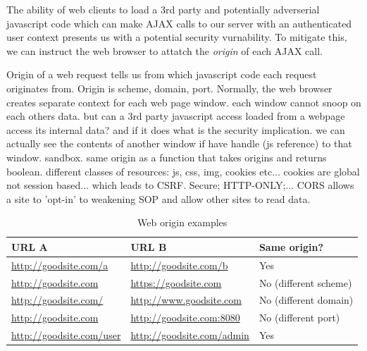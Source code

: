 \documentclass[a4paper]{article}
\begin{document}


The ability of web clients to load a 3rd party and potentially adverserial javascript code which can make AJAX calls to our
server with an authenticated user context presents us with a potential security vurnability. To mitigate this, we can instruct
the web browser to attatch the \emph{origin} of each AJAX call.

Origin of a web request tells us from which javascript code each request originates from. Origin is scheme, domain, port.
Normally, the web browser creates separate context for each web page window. each window cannot snoop on each others data.
but can a 3rd party javascript access loaded from a webpage access its internal data? and if it does what is the security
implication. we can actually see the contents of another window if have handle (js reference) to that window. sandbox.
same origin as a function that takes origins and returns boolean. different classes of resources: js, css, img, cookies etc...
cookies are global not session based... which leads to CSRF. Secure; HTTP-ONLY;...
CORS allows a site to 'opt-in' to weakening SOP and allow other sites to read data.

\begin{table}
    \centering
    \footnotesize
    \sffamily
    \begin{tabularx}{\textwidth}{l l X}
        \toprule
        URL A                          & URL B                           & Same origin?          \\
        \midrule
        \url{http://goodsite.com/a}    & \url{http://goodsite.com/b}     & Yes                   \\
        \url{http://goodsite.com}      & \url{https://goodsite.com}      & No (different scheme) \\
        \url{http://goodsite.com/}     & \url{http://www.goodsite.com}   & No (different domain) \\
        \url{http://goodsite.com}      & \url{http://goodsite.com:8080}  & No (different port)   \\
        \url{http://goodsite.com/user} & \url{http://goodsite.com/admin} & Yes                   \\
        \bottomrule
    \end{tabularx}
    \normalsize
    \normalfont
    \caption{Web origin examples}
\end{table}
\end{document}
